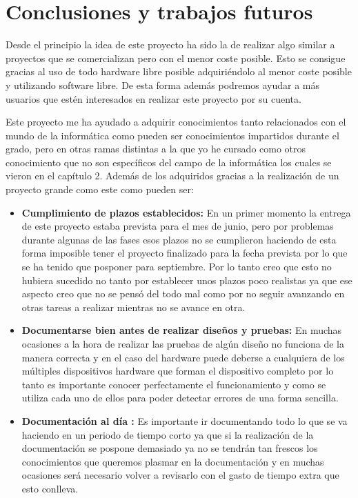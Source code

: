 \chapter{Conclusiones y trabajos futuros}

Desde el principio la idea de este proyecto ha sido la de realizar algo similar a proyectos que se comercializan pero con el menor coste posible. Esto se consigue gracias al uso de todo hardware libre posible adquiriéndolo al menor coste posible y utilizando software libre. De esta forma además podremos ayudar a más usuarios que estén interesados en realizar este proyecto por su cuenta.

Este proyecto me ha ayudado a adquirir conocimientos tanto relacionados con el mundo de la informática como pueden ser conocimientos impartidos durante el grado, pero en otras ramas distintas a la que yo he cursado como otros conocimiento que no son específicos del campo de la informática los cuales se vieron en el capítulo 2. Además de los adquiridos gracias a la realización de un proyecto grande como este como pueden ser:

\begin{itemize}
	\item\textbf{Cumplimiento de plazos establecidos:} En un primer momento la entrega de este proyecto estaba prevista para el mes de junio, pero por problemas durante algunas de las fases esos plazos no se cumplieron haciendo de esta forma imposible tener el proyecto finalizado para la fecha prevista por lo que se ha tenido que posponer para septiembre. Por lo tanto creo que esto no hubiera sucedido no tanto por establecer unos plazos poco realistas ya que ese aspecto creo que no se pensó del todo mal como por no seguir avanzando en otras tareas a realizar mientras no se avance en otra.
	\item\textbf{Documentarse bien antes de realizar diseños y pruebas:} En muchas ocasiones a la hora de realizar las pruebas de algún diseño no funciona de la manera correcta y en el caso del hardware puede deberse a cualquiera de los múltiples dispositivos hardware que forman el dispositivo completo por lo tanto es importante conocer perfectamente el funcionamiento y como se utiliza cada uno de ellos para poder detectar errores de una forma sencilla.
	\item\textbf{Documentación al día :} Es importante ir documentando todo lo que se va haciendo en un periodo de tiempo corto ya que si la realización de la documentación se pospone demasiado ya no se tendrán tan frescos los conocimientos que queremos plasmar en la documentación y en muchas ocasiones será necesario volver a revisarlo con el gasto de tiempo extra que esto conlleva.
\end{itemize}
	
